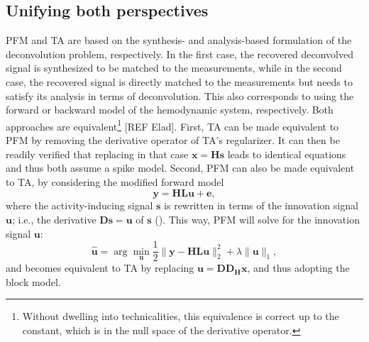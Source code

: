 \subsection{Unifying both perspectives}

PFM and TA are based on the synthesis- and analysis-based formulation of the deconvolution problem, respectively. In the first case, the recovered deconvolved signal is synthesized to be matched to the measurements, while in the second case, the recovered signal is directly matched to the measurements but needs to satisfy its analysis in terms of deconvolution. This also corresponds to using the forward or backward model of the hemodynamic system, respectively. Both approaches are equivalent\footnote{Without dwelling into technicalities, this equivalence is correct up to the constant, which is in the null space of the derivative operator.} [REF Elad]. First, TA can be made equivalent to PFM by removing the derivative operator of TA's regularizer. It can then be readily verified that replacing in that case $\mathbf{x}=\mathbf{Hs}$ leads to identical equations and thus both assume a spike model. Second, PFM can also be made equivalent to TA, by considering the modified forward model
$$
\mathbf{y} = \mathbf{H L u} + \mathbf{e},
$$
where the activity-inducing signal $\mathbf{s}$ is rewritten in terms of the innovation signal $\mathbf{u}$; i.e., the derivative $\mathbf{Ds}=\mathbf{u}$ of $\mathbf{s}$ (\citealt{cherkaoui2019SparsitybasedBlindDeconvolution,urunuela2020StabilityBasedSparseParadigm}). This way, PFM will solve for the innovation signal $\mathbf{u}$: 
\begin{equation}
    \label{eq:pfm_block}
    \hat{\mathbf{u}} = \arg \min_{\mathbf{u}} \frac{1}{2} \| \mathbf{y} - \mathbf{HLu} \|_2^2 + \lambda \| \mathbf{u} \|_1,
\end{equation}
and becomes equivalent to TA by replacing $\mathbf{u}=\mathbf{D D_H x}$, and thus adopting the block model.

